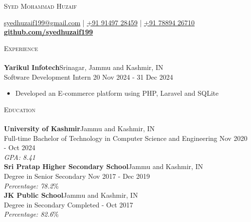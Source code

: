 \documentclass[a4paper]{article}
\newcommand{\lineunder} {
    \vspace*{-8pt} \\
    \hspace*{-18pt} \hrulefill \\
}
\newcommand{\header} [1] {
    {\hspace*{-18pt}\vspace*{6pt} \textsc{#1}}
    \vspace*{-6pt} \lineunder
}
\begin{document}
    \vspace*{-40pt}

    

%
%
  \vspace*{-2pt}
  \begin{center}
    {\Huge \scshape {Syed Mohammad Huzaif}}\\
    \vspace*{2pt}
    
    \vspace*{2pt}
    \href{mailto:syedhuzaif199@gmail.com}{syedhuzaif199@gmail.com} | \href{tel:+919149728459}{+91 91497 28459} | \href{tel:+917889426710}{+91 78894 26710}\\
    \vspace*{2pt}
    \textbf{\href{https://github.com/syedhuzaif199}{github.com/syedhuzaif199}}
  \end{center}

      \header{Experience}
      \vspace{2mm}
      \textbf{Yarikul Infotech}\hfill Srinagar, Jammu and Kashmir, IN\\
Software Development Intern \hfill 20 Nov 2024 - 31 Dec 2024\\
\vspace{-2mm}
\begin{itemize}
\item[] Developed an E-commerce platform using PHP, Laravel and SQLite
\end{itemize}

    \vspace{2mm}

      \header{Education}
      \vspace{2mm}
      \textbf{University of Kashmir}\hfill Jammu and Kashmir, IN\\
Full-time Bachelor of Technology in Computer Science and Engineering \hfill Nov 2020 - Oct 2024\\
{\sl GPA: 8.41}\\
\vspace{2mm}
      \textbf{Sri Pratap Higher Secondary School}\hfill Jammu and Kashmir, IN\\
Degree in Senior Secondary \hfill Nov 2017 - Dec 2019\\
{\sl Percentage: 78.2}\%\\
\vspace{2mm}
      \textbf{JK Public School}\hfill Jammu and Kashmir, IN\\
Degree in Secondary \hfill Completed - Oct 2017\\
{\sl Percentage: 82.6}\%\\
\vspace{2mm}
\end{document}
